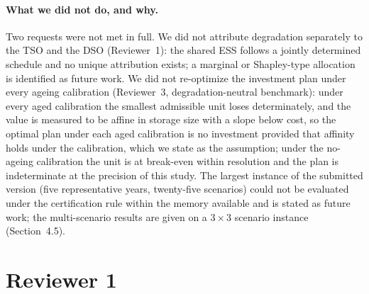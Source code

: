 \documentclass[11pt]{article}
\begin{document}
\paragraph{What we did not do, and why.}
Two requests were not met in full. We did not attribute degradation separately to the TSO and the DSO
(Reviewer~1): the shared ESS follows a jointly determined schedule and no unique attribution exists; a
marginal or Shapley-type allocation is identified as future work. We did not re-optimize the investment
plan under every ageing calibration (Reviewer~3, degradation-neutral benchmark): under every aged
calibration the smallest admissible unit loses determinately, and the value is measured to be affine in
storage size with a slope below cost, so the optimal plan under each aged calibration is no investment
provided that affinity holds under the calibration, which we state as the assumption; under the
no-ageing calibration the unit is at break-even within resolution and the plan is indeterminate at the
precision of this study. The largest instance of the submitted version (five representative years,
twenty-five scenarios) could not be evaluated under the certification rule within the memory available
and is stated as future work; the multi-scenario results are given on a $3\times3$ scenario instance
(Section~4.5).

\section*{Reviewer 1}
\end{document}
